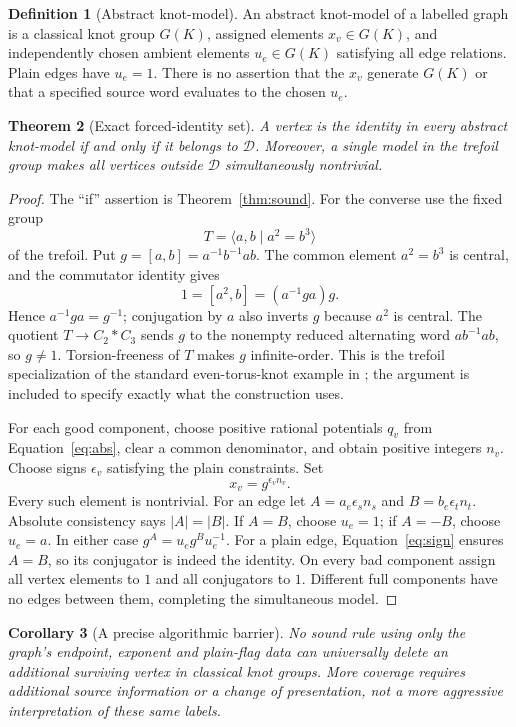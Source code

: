 \documentclass[11pt]{article}
\newtheorem{theorem}{Theorem}[section]
\newtheorem{corollary}[theorem]{Corollary}
\theoremstyle{definition}\newtheorem{definition}[theorem]{Definition}
\theoremstyle{remark}\newtheorem{remark}[theorem]{Remark}
\newcommand{\dead}{\mathcal D}
\begin{document}
\begin{definition}[Abstract knot-model]
An abstract knot-model of a labelled graph is a classical knot group $G(K)$,
assigned elements $x_v\in G(K)$, and independently chosen ambient elements
$u_e\in G(K)$ satisfying all edge relations. Plain edges have $u_e=1$.
There is no assertion that the $x_v$ generate $G(K)$ or that a specified
source word evaluates to the chosen $u_e$.
\end{definition}

\begin{theorem}[Exact forced-identity set]\label{thm:sharp}
A vertex is the identity in every abstract knot-model if and only if it
belongs to $\dead$. Moreover, a single model in the trefoil group makes
all vertices outside $\dead$ simultaneously nontrivial.
\end{theorem}
\begin{proof}
The ``if'' assertion is Theorem~\ref{thm:sound}. For the converse use the
fixed group
\[
 T=\langle a,b\mid a^2=b^3\rangle
\]
of the trefoil. Put $g=[a,b]=a^{-1}b^{-1}ab$. The common element $a^2=b^3$
is central, and the commutator identity gives
\[
 1=[a^2,b]=(a^{-1}ga)g.
\]
Hence $a^{-1}ga=g^{-1}$; conjugation by $a$ also inverts $g$ because
$a^2$ is central. The quotient $T\to C_2*C_3$ sends $g$ to the nonempty
reduced alternating word $a b^{-1} a b$, so $g\ne1$. Torsion-freeness of
$T$ makes $g$ infinite-order. This is the trefoil specialization of the
standard even-torus-knot example in \cite{HMT}; the argument is included
to specify exactly what the construction uses.

For each good component, choose positive rational potentials $q_v$ from
Equation~\eqref{eq:abs}, clear a common denominator, and obtain positive
integers $n_v$. Choose signs $\epsilon_v$ satisfying the plain constraints.
Set
\[
 x_v=g^{\epsilon_v n_v}.
\]
Every such element is nontrivial. For an edge let
$A=a_e\epsilon_s n_s$ and $B=b_e\epsilon_t n_t$.
Absolute consistency says $|A|=|B|$. If $A=B$, choose $u_e=1$; if $A=-B$,
choose $u_e=a$. In either case $g^A=u_e g^B u_e^{-1}$. For a plain edge,
Equation~\eqref{eq:sign} ensures $A=B$, so its conjugator is indeed the
identity. On every bad component assign all vertex elements to $1$ and
all conjugators to $1$. Different full components have no edges between
them, completing the simultaneous model.
\end{proof}

\begin{corollary}[A precise algorithmic barrier]\label{cor:barrier}
No sound rule using only the graph's endpoint, exponent and plain-flag
data can universally delete an additional surviving vertex in classical
knot groups. More coverage requires additional source information or a
change of presentation, not a more aggressive interpretation of these
same labels.
\end{corollary}
\end{document}
